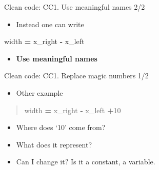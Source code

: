 \documentclass[
  8pt,
  ignorenonframetext,
]{beamer}
\newenvironment{Shaded}{\begin{snugshade}}{\end{snugshade}}
\newcommand{\DecValTok}[1]{\textcolor[rgb]{0.00,0.00,0.81}{#1}}
\newcommand{\NormalTok}[1]{#1}
\newcommand{\OperatorTok}[1]{\textcolor[rgb]{0.81,0.36,0.00}{\textbf{#1}}}
\providecommand{\tightlist}{%
  \setlength{\itemsep}{0pt}\setlength{\parskip}{0pt}}
\begin{document}
\begin{frame}[fragile]{Clean code: CC1. Use meaningful names 2/2}
\protect\hypertarget{clean-code-cc1.-use-meaningful-names-22}{}
\begin{itemize}
\tightlist
\item
  Instead one can write
\end{itemize}

\begin{Shaded}
\begin{Highlighting}[]
\NormalTok{width }\OperatorTok{=}\NormalTok{ x\_right }\OperatorTok{{-}}\NormalTok{ x\_left}
\end{Highlighting}
\end{Shaded}

\begin{itemize}
\tightlist
\item
  \textbf{Use meaningful names}
\end{itemize}
\end{frame}

\begin{frame}[fragile]{Clean code: CC1. Replace magic numbers 1/2}
\protect\hypertarget{clean-code-cc1.-replace-magic-numbers-12}{}
\begin{itemize}[<+->]
\tightlist
\item
  Other example
\end{itemize}

\begin{quote}
\begin{Shaded}
\begin{Highlighting}[]
\NormalTok{width }\OperatorTok{=}\NormalTok{ x\_right }\OperatorTok{{-}}\NormalTok{ x\_left }\OperatorTok{+}\DecValTok{10}
\end{Highlighting}
\end{Shaded}
\end{quote}

\begin{itemize}[<+->]
\tightlist
\item
  Where does `10' come from?
\end{itemize}

\begin{itemize}[<+->]
\tightlist
\item
  What does it represent?
\end{itemize}

\begin{itemize}[<+->]
\tightlist
\item
  Can I change it? Is it a constant, a variable.
\end{itemize}
\end{frame}
\end{document}
